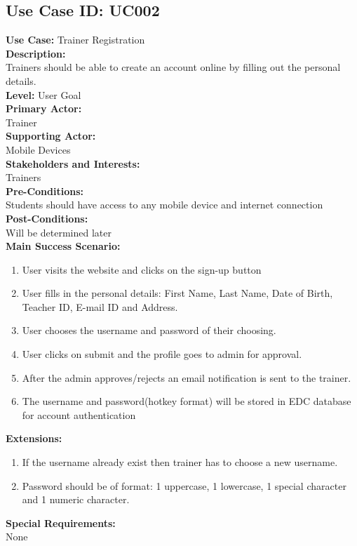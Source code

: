 \documentclass{report}
\begin{document}
\subsection{\textbf{Use Case ID:} UC002}
\textbf{Use Case:} Trainer Registration\\[0.3cm]
\textbf{Description:}\\
Trainers should be able to create an account online by filling out the personal details.\\[0.3cm]
\textbf{Level:} User Goal\\[0.3cm]
\textbf{Primary Actor:}\\
Trainer\\[0.3cm]
\textbf{Supporting Actor:}\\
Mobile Devices\\[0.3cm]
\textbf{Stakeholders and Interests:}\\
Trainers\\[0.3cm]
\textbf{Pre-Conditions:}\\
Students should have access to any mobile device and internet connection\\[0.3cm]
\textbf{Post-Conditions:}\\
Will be determined later\\[0.3cm]
\textbf{\large {Main Success Scenario:}}
\begin{enumerate}
    \item User visits the website and clicks on the sign-up button
    \item User fills in the personal details: First Name, Last Name, Date of Birth, Teacher ID, E-mail ID and Address.
    \item User chooses the username and password of their choosing.
    \item User clicks on submit and the profile goes to admin for approval.
    \item After the admin approves/rejects an email notification is sent to the trainer.
    \item The username and password(hotkey format) will be stored in EDC database for account authentication
\end{enumerate}
\textbf{\large Extensions:}
\begin{enumerate}
    \item If the username already exist then trainer has to choose a new username.
    \item Password should be of format: 1 uppercase, 1 lowercase, 1 special character and 1 numeric character.
\end{enumerate}
\textbf{\large Special Requirements:}\\
None\\
\end{document}
